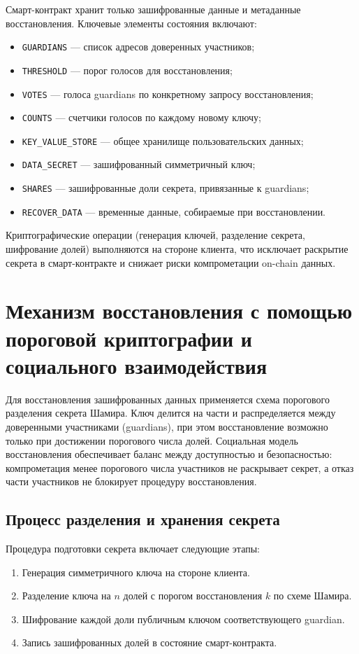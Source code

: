 Смарт-контракт хранит только зашифрованные данные и метаданные восстановления.
Ключевые элементы состояния включают:
\begin{itemize}
  \item \texttt{GUARDIANS} --- список адресов доверенных участников;
  \item \texttt{THRESHOLD} --- порог голосов для восстановления;
  \item \texttt{VOTES} --- голоса guardians по конкретному запросу восстановления;
  \item \texttt{COUNTS} --- счетчики голосов по каждому новому ключу;
  \item \texttt{KEY\_VALUE\_STORE} --- общее хранилище пользовательских данных;
  \item \texttt{DATA\_SECRET} --- зашифрованный симметричный ключ;
  \item \texttt{SHARES} --- зашифрованные доли секрета, привязанные к guardians;
  \item \texttt{RECOVER\_DATA} --- временные данные, собираемые при восстановлении.
\end{itemize}

Криптографические операции (генерация ключей, разделение секрета, шифрование долей)
выполняются на стороне клиента, что исключает раскрытие секрета в смарт-контракте и
снижает риски компрометации on-chain данных.

\section{Механизм восстановления с помощью пороговой криптографии и социального взаимодействия}\label{sec:ch5/sec2}

Для восстановления зашифрованных данных применяется схема порогового разделения
секрета Шамира. Ключ делится на части и распределяется между доверенными
участниками (guardians), при этом восстановление возможно только при достижении
порогового числа долей. Социальная модель восстановления обеспечивает баланс между
доступностью и безопасностью: компрометация менее порогового числа участников не
раскрывает секрет, а отказ части участников не блокирует процедуру восстановления.

\subsection{Процесс разделения и хранения секрета}\label{sec:ch5/sec2/share}

Процедура подготовки секрета включает следующие этапы:
\begin{enumerate}
  \item Генерация симметричного ключа на стороне клиента.
  \item Разделение ключа на $n$ долей с порогом восстановления $k$ по схеме Шамира.
  \item Шифрование каждой доли публичным ключом соответствующего guardian.
  \item Запись зашифрованных долей в состояние смарт-контракта.
\end{enumerate}

